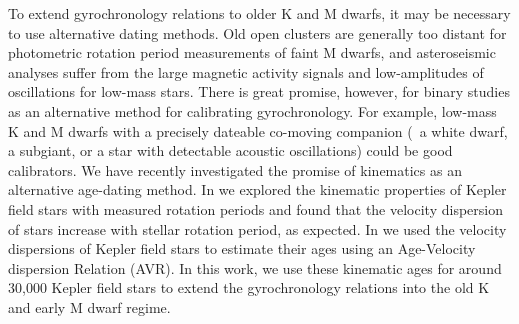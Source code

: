 To extend gyrochronology relations to older K and M dwarfs, it may be
necessary to use alternative dating methods.
Old open clusters are generally too distant for photometric rotation period
measurements of faint M dwarfs, and asteroseismic analyses suffer from the
large magnetic activity signals and low-amplitudes of oscillations for
low-mass stars.
There is great promise, however, for binary studies as an alternative method
for calibrating gyrochronology.
For example, low-mass K and M dwarfs with a precisely dateable co-moving
companion (\eg\ a white dwarf, a subgiant, or a star with detectable acoustic
oscillations) could be good calibrators.
We have recently investigated the promise of kinematics as an alternative
age-dating method.
In \citet{angus2020} we explored the kinematic properties of Kepler field
stars with measured rotation periods and found that the velocity dispersion of
stars increase with stellar rotation period, as expected.
In \citet{lu2021} we used the velocity dispersions of Kepler field stars to
estimate their ages using an Age-Velocity dispersion Relation (AVR).
In this work, we use these kinematic ages for around 30,000 Kepler field
stars to extend the gyrochronology relations into the old K and early M dwarf
regime.



